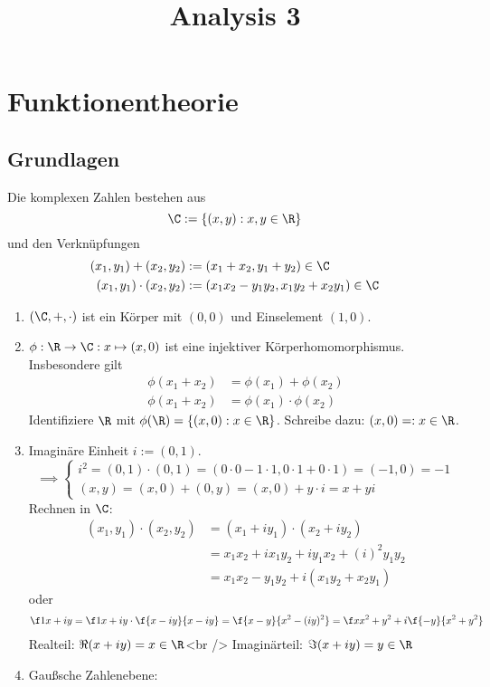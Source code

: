 \documentclass[a4paper,10pt]{scrartcl}
\title{Analysis 3}
\begin{document}
\maketitle

\tableofcontents
\newpage

\section{Funktionentheorie}

\subsection{Grundlagen}

\begin{df}
	\label{df:1.1}	
	Die komplexen Zahlen bestehen aus
	\[
		\C := \{(x,y) : x,y\in \R\}
	\]
	und den Verknüpfungen
	\begin{align*}
		(x_1,y_1) + (x_2,y_2) &:= (x_1 + x_2, y_1 + y_2) \in \C \\
		(x_1,y_1) \cdot (x_2,y_2) &:= (x_1x_2 - y_1y_2, x_1y_2 + x_2y_1) \in \C
	\end{align*}
\end{df}

\begin{nt}
	\label{nt:1.1}
	\begin{enumerate}
		\item $(\C,+,\cdot)$ ist ein Körper mit $(0,0)$ und Einselement $(1,0)$.
		\item 
			$\phi: \R\to \C : x\mapsto (x,0)$ ist eine injektiver Körperhomomorphismus.
			Insbesondere gilt
			\begin{align*}
				\phi(x_1+x_2) &= \phi(x_1) + \phi(x_2)\\
				\phi(x_1+x_2) &= \phi(x_1) \cdot \phi(x_2)
			\end{align*}
			Identifiziere $\R$ mit $\phi(\R) = \{(x,0) : x\in \R\}$.
			Schreibe dazu: $(x,0) =: x \in \R$.
		\item
			Imaginäre Einheit $i:= (0,1)$.
			\[
				\implies \begin{cases}
				i^2 = (0,1)\cdot (0,1) = (0\cdot 0 - 1\cdot 1, 0\cdot 1 + 0\cdot 1) = (-1,0) = -1 \\
				(x,y) = (x,0) + (0,y) = (x,0) + y\cdot i = x + yi
				\end{cases}
			\]
			Rechnen in $\C$:
			\begin{align*}
				(x_1,y_1)\cdot (x_2,y_2) &= (x_1 +iy_1)\cdot (x_2 + iy_2)\\
				&= x_1x_2 + ix_1y_2 + iy_1x_2 + (i)^2y_1y_2\\
				&= x_1x_2 - y_1y_2 + i(x_1y_2 + x_2y_1)
			\end{align*}
			oder
			\begin{align*}
				\f 1{x+iy} = \f 1{x+iy}\cdot \f {x-iy}{x-iy} = \f{x-y}{x^2-(iy)^2} = \f x{x^2+y^2} + i \f{-y}{x^2+y^2}
			\end{align*}
			Realteil: $\Re(x+iy) = x\in \R$<br />
			Imaginärteil: $\Im(x+iy) = y\in\R$
		\item
			Gaußsche Zahlenebene:
	\end{enumerate}
\end{nt}
\end{document}
